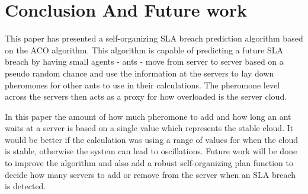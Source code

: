 \documentclass[conference]{IEEEtran}
\begin{document}

\section{Conclusion And Future work}
\label{sec:conclusion}

This paper has presented a self-organizing SLA breach prediction algorithm based on the ACO algorithm. This algorithm is capable of predicting a future SLA breach by having small agents - ants - move from server to server based on a pseudo random chance and use the information at the servers to lay down pheromones for other ants to use in their calculations. The pheromone level across the servers then acts as a proxy for how overloaded is the server cloud.

In this paper the amount of how much pheromone to add and how long an ant waits at a server is based on a single value which represents the stable cloud. It would be better if the calculation was using a range of values for when the cloud is stable, otherwise the system can lead to oscillations. Future work will be done to improve the algorithm and also add a robust self-organizing plan function to decide how many servers to add or remove from the server when an SLA breach is detected.





%
%
%






\end{document}
